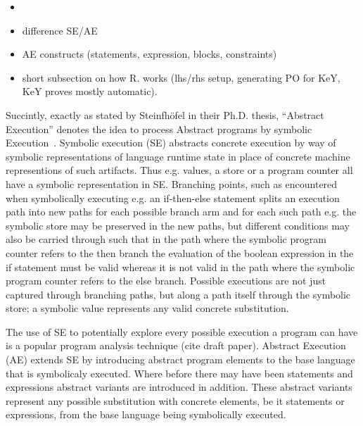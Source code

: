 \begin{itemize}
\item {}
\item difference SE/AE
\item AE constructs (statements, expression, blocks, constraints)
\item short subsection on how R. works (lhs/rhs setup, generating PO
  for KeY, KeY proves mostly automatic).
\end{itemize}


Succintly, exactly as stated by Steinfhöfel in their Ph.D. thesis, “Abstract Execution” denotes the idea to process Abstract programs by symbolic Execution~\cite{steinhoefel-20}.
Symbolic execution (SE) \cite{DBLP:journals/csur/BaldoniCDDF18,DBLP:journals/ac/YangFBCW19} abstracts concrete execution by way of symbolic representations of language runtime
state in place of concrete machine representions of such artifacts.
Thus e.g. values, a store or a program counter all have a symbolic representation in SE.
Branching points, such as encountered when symbolically executing e.g. an if-then-else statement splits an execution path into new paths for each possible branch arm and for each such
path e.g. the symbolic store may be preserved in the new paths, but different conditions may also be carried through such that in the path where the symbolic program counter refers
to the then branch the evaluation of the boolean expression in the if statement must be valid whereas it is not valid in the path where the symbolic program counter refers to the else branch.
Possible executions are not just captured through branching paths, but along a path itself through the symbolic store; a symbolic value represents any valid concrete substitution.

The use of SE to potentially explore every possible execution a program can have is a popular program analysis technique (cite draft paper). Abstract Execution (AE) extends SE by
introducing abstract program elements to the base language that is symbolicaly executed.
Where before there may have been statements and expressions abstract variants are introduced in addition.
These abstract variants represent any possible substitution with concrete elements, be it statements or expressions, from the base language being symbolically executed.


